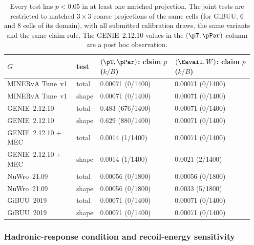 \begin{table}[htbp]
  \caption[Matched-projection test probabilities]{Every test has $p<0.05$ in at least one matched projection. The joint tests are restricted to matched $3\times3$ coarse projections of the same cells (for GiBUU, 6 and 8 cells of its domain), with all submitted calibration draws, the same variants and the same claim rule. The GENIE~2.12.10 values in the $(\pT,\pPar)$ column are a post hoc observation.}
  \label{tab:joint5d-projections}
  \centering\small
  \begin{tabular}{@{}llll@{}}
    \toprule
    $G$ & test & $(\pT,\pPar)$: claim $p$ ($k/B$) & $(\Eavail,W)$: claim $p$ ($k/B$) \\
    \midrule
    MINERvA Tune~v1     & total & 0.00071 (0/1400) & 0.00071 (0/1400) \\
    MINERvA Tune~v1     & shape & 0.00071 (0/1400) & 0.00071 (0/1400) \\
    GENIE~2.12.10       & total & 0.483 (676/1400) & 0.00071 (0/1400) \\
    GENIE~2.12.10       & shape & 0.629 (880/1400) & 0.00071 (0/1400) \\
    GENIE~2.12.10 + MEC & total & 0.0014 (1/1400)  & 0.00071 (0/1400) \\
    GENIE~2.12.10 + MEC & shape & 0.0014 (1/1400)  & 0.0021 (2/1400) \\
    NuWro~21.09         & total & 0.00056 (0/1800) & 0.00056 (0/1800) \\
    NuWro~21.09         & shape & 0.00056 (0/1800) & 0.0033 (5/1800) \\
    GiBUU~2019          & total & 0.00071 (0/1400) & 0.00071 (0/1400) \\
    GiBUU~2019          & shape & 0.00071 (0/1400) & 0.00071 (0/1400) \\
    \bottomrule
  \end{tabular}
\end{table}

\subsubsection{Hadronic-response condition and recoil-energy sensitivity}


